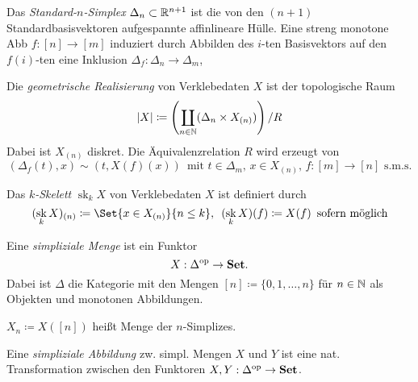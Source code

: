 \documentclass{cheat-sheet}
\DeclareMathOperator{\sk}{sk} %
\begin{document}
\begin{defn}
  Das \emph{Standard-$n$-Simplex} $\Delta_n \subset \mathbb{R}^{n+1}$ ist die von den $(n{+}1)$ Standardbasisvektoren aufgespannte affinlineare Hülle. Eine streng monotone Abb $f : [n] \to [m]$ induziert durch Abbilden des $i$-ten Basisvektors auf den $f(i)$-ten eine Inklusion $\Delta_f : \Delta_n \to \Delta_m$, 
\end{defn}

\begin{defn}
  Die \emph{geometrische Realisierung} von Verklebedaten $X$ ist der topologische Raum
  \[ \lvert X\rvert \coloneqq \left( \coprod_{n \in \mathbb{N}} (\Delta_n \times X_{(n)}) \right) / R \]
  Dabei ist $X_{(n)}$ diskret. Die Äquivalenzrelation $R$ wird erzeugt von
  \[
    (\Delta_f(t), x) \sim (t, X(f)(x)) \enspace
    \text{mit $t \in \Delta_m$, $x \in X_{(n)}$, $f : [m] {\to} [n]$ s.m.s.}
  \]
\end{defn}


\begin{defn}
  Das \emph{$k$-Skelett} $\sk_k X$ von Verklebedaten $X$ ist definiert durch
  \[
    (\sk_k X)_{(n)} \coloneqq
    \Set{ x \in X_{(n)} }{ n \leq k }, \enspace
    (\sk_k X)(f) \coloneqq X(f) \enspace \text{sofern möglich}
  \]
\end{defn}



\begin{defn}
  Eine \emph{simpliziale Menge} ist ein Funktor
  \[ X : \Delta^{\mathrm{op}} \to \mathbf{Set}. \]
  Dabei ist $\Delta$ die Kategorie mit den Mengen
  $[n] \coloneqq \{ 0, 1, \ldots, n \}$ für $n \in \mathbb{N}$ als Objekten und monotonen Abbildungen.
\end{defn}

\begin{nota}
  $X_n \coloneqq X([n])$ heißt Menge der $n$-Simplizes.
\end{nota}

\begin{defn}
  Eine \emph{simpliziale Abbildung} zw. simpl. Mengen $X$ und $Y$ ist eine nat. Transformation zwischen den Funktoren $X, Y : \Delta^{\mathrm{op}} \to \mathbf{Set}$.
\end{defn}
\end{document}
